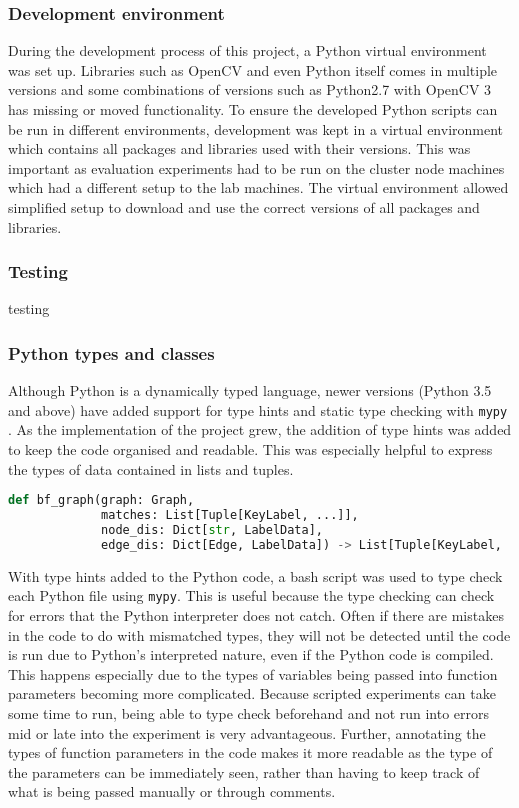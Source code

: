 \subsubsection{Development environment}
During the development process of this project, a Python virtual environment was set up. Libraries such as OpenCV and even Python itself comes in multiple versions and some combinations of versions such as Python2.7 with OpenCV 3 has missing or moved functionality. To ensure the developed Python scripts can be run in different environments, development was kept in a virtual environment which contains all packages and libraries used with their versions. This was important as evaluation experiments had to be run on the cluster node machines which had a different setup to the lab machines. The virtual environment allowed simplified setup to download and use the correct versions of all packages and libraries.

\subsubsection{Testing}
testing


\subsubsection{Python types and classes}
Although Python is a dynamically typed language, newer versions (Python 3.5 and above) have added support for type hints and static type checking with \texttt{mypy} \cite{mypy}. As the implementation of the project grew, the addition of type hints was added to keep the code organised and readable. This was especially helpful to express the types of data contained in lists and tuples.
\begin{lstlisting}[language=Python, caption={Example of a function definition with added type hints. The types from Python's \texttt{typing} class are highlighted here in red.}]
def bf_graph(graph: Graph,
             matches: List[Tuple[KeyLabel, ...]],
             node_dis: Dict[str, LabelData],
             edge_dis: Dict[Edge, LabelData]) -> List[Tuple[KeyLabel, ...]]:
\end{lstlisting}
With type hints added to the Python code, a bash script was used to type check each Python file using \texttt{mypy}. This is useful because the type checking can check for errors that the Python interpreter does not catch. Often if there are mistakes in the code to do with mismatched types, they will not be detected until the code is run due to Python's interpreted nature, even if the Python code is compiled. This happens especially due to the types of variables being passed into function parameters becoming more complicated. Because scripted experiments can take some time to run, being able to type check beforehand and not run into errors mid or late into the experiment is very advantageous. Further, annotating the types of function parameters in the code makes it more readable as the type of the parameters can be immediately seen, rather than having to keep track of what is being passed manually or through comments. 

